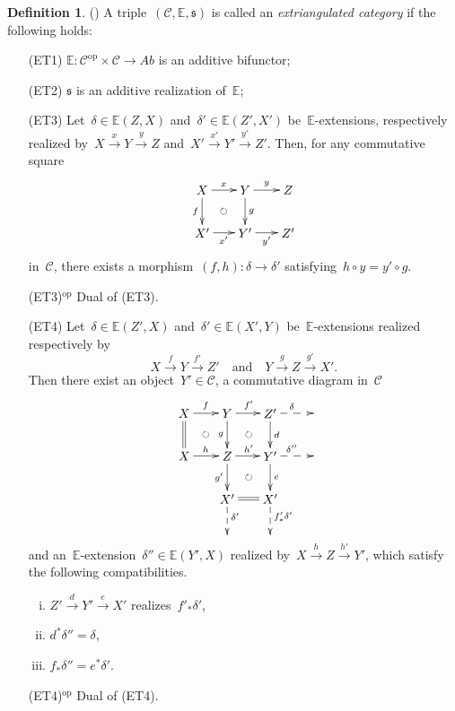 \documentclass{amsart}
\theoremstyle{definition}
\newtheorem{definition}[theorem]{Definition}
\newcommand{\darkblue}{\color{darkblue}} %
\newcommand{\defn}[1]{\textsl{\darkblue #1}} %
\newcommand{\cat}{\mathcal{C}}
\begin{document}
\begin{definition}(\cite[Def.~2.12]{NakaokaPalu})
A triple~$(\cat,\mathbb{E},\mathfrak{s})$ is called an \defn{extriangulated category} if the following holds:
\begin{itemize}
\item[{\rm (ET1)}] $\mathbb{E}:\cat^{\mathrm{op}}\times\cat\to\mathit{Ab}$ is an additive bifunctor;
\item[{\rm (ET2)}] $\mathfrak{s}$ is an additive realization of~$\mathbb{E}$;
\item[{\rm (ET3)}] Let~$\delta\in\mathbb{E}(Z,X)$ and~$\delta'\in\mathbb{E}(Z',X')$ be~$\mathbb{E}$-extensions, respectively realized by~$X\xrightarrow{x}Y\xrightarrow{y}Z$ and~$X'\xrightarrow{x'}Y'\xrightarrow{y'}Z'$. Then, for any commutative square
\[
\xy
(-12,6)*+{X}="0";
(0,6)*+{Y}="2";
(12,6)*+{Z}="4";
%
(-12,-6)*+{X'}="10";
(0,-6)*+{Y'}="12";
(12,-6)*+{Z'}="14";
%
{\ar^{x} "0";"2"};
{\ar^{y} "2";"4"};
%
{\ar_{f} "0";"10"};
{\ar^{g} "2";"12"};
%
{\ar_{x'} "10";"12"};
{\ar_{y'} "12";"14"};
%
{\ar@{}|{} "0";"12"};
%
{\ar@{}|\circlearrowright "0";"12"};
\endxy 
\]
in~$\cat$, there exists a morphism~$(f,h):\delta\to\delta'$ satisfying~$h\circ y=y'\circ g$.
\item[{\rm (ET3)$^{\mathrm{op}}$}] Dual of {\rm (ET3)}.
\item[{\rm (ET4)}] Let~$\delta\in\mathbb{E}(Z',X)$ and~$\delta'\in\mathbb{E}(X',Y)$ be~$\mathbb{E}$-extensions realized respectively by
\[
X\overset{f}{\longrightarrow}Y\overset{f'}{\longrightarrow}Z' \quad\text{and}\quad Y\overset{g}{\longrightarrow}Z\overset{g'}{\longrightarrow}X'.
\]
Then there exist an object~$Y'\in\cat$, a commutative diagram in~$\cat$
\[
\xy
(-18,6)*+{X}="0";
(-6,6)*+{Y}="2";
(6,6)*+{Z'}="4";
(18,6)="6";
%
(-18,-6)*+{X}="10";
(-6,-6)*+{Z}="12";
(6,-6)*+{Y'}="14";
(18,-6)="16";
%
(-6,-18)*+{X'}="22";
(6,-18)*+{X'}="24";
%
(-6,-28)="32";
(6,-28)="34";
%
%
{\ar^{f} "0";"2"};
{\ar^{f'} "2";"4"};
%
{\ar@{=} "0";"10"};
{\ar_{g} "2";"12"};
{\ar^{d} "4";"14"};
%
{\ar^{h} "10";"12"};
{\ar^{h'} "12";"14"};
%
{\ar_{g'} "12";"22"};
{\ar^{e} "14";"24"};
%
{\ar@{=} "22";"24"};
%
{\ar@{}|{} "0";"12"};
{\ar@{}|{} "2";"14"};
{\ar@{}|{} "12";"24"};
%
{\ar@{-->}^\delta "4";"6"};
{\ar@{-->}^{\delta''} "14";"16"};
{\ar@{-->}^{\delta'} "22";"32"};
{\ar@{-->}^{f'_\ast \delta'} "24";"34"};
%
{\ar@{}|\circlearrowright "0";"12"};
{\ar@{}|\circlearrowright "2";"14"};
{\ar@{}|\circlearrowright "12";"24"};
\endxy
\]
and an~$\mathbb{E}$-extension~$\delta''\in\mathbb{E}(Y',X)$ realized by~$X\overset{h}{\longrightarrow}Z\overset{h'}{\longrightarrow}Y'$, which satisfy the following compatibilities.
  \begin{enumerate}[(i)]
    \item $Z'\overset{d}{\longrightarrow}Y'\overset{e}{\longrightarrow}X'$ realizes~$f'_\ast\delta'$,
    \item $d^\ast\delta''=\delta$,
    \item $f_\ast\delta''=e^\ast\delta'$. 
  \end{enumerate}
\item[{\rm (ET4)$^{\mathrm{op}}$}] Dual of {\rm (ET4)}.
\end{itemize}
\end{definition}
\end{document}
